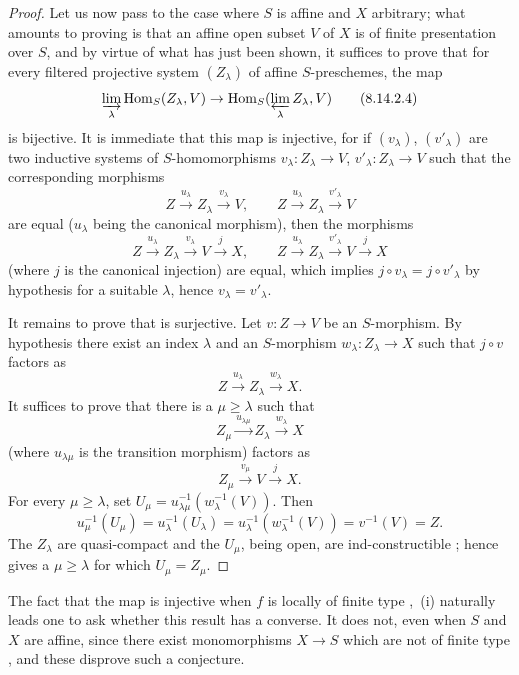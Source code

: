 \begin{proof}
Let us now pass to the case where $S$ is affine and $X$ arbitrary; what amounts to proving is that an affine open subset $V$ of $X$ is of finite presentation over $S$, and by virtue of what has just been shown, it suffices to prove that for every filtered projective system $(Z_\lambda)$ of affine $S$-preschemes, the map
\begin{equation}
\label{IV.8.14.2.4}
\varinjlim_\lambda\operatorname{Hom}_S(Z_\lambda,V)\to\operatorname{Hom}_S(\varprojlim_\lambda Z_\lambda,V) \tag{8.14.2.4}
\end{equation}
is bijective.
It is immediate that this map is injective, for if $(v_\lambda)$, $(v'_\lambda)$ are two inductive systems of $S$-homomorphisms $v_\lambda:Z_\lambda\to V$, $v'_\lambda:Z_\lambda\to V$ such that the corresponding morphisms
\[
Z\xrightarrow{u_\lambda}Z_\lambda\xrightarrow{v_\lambda}V,\qquad
Z\xrightarrow{u_\lambda}Z_\lambda\xrightarrow{v'_\lambda}V
\]
are equal ($u_\lambda$ being the canonical morphism), then the morphisms
\[
Z\xrightarrow{u_\lambda}Z_\lambda\xrightarrow{v_\lambda}V\xrightarrow{j}X,\qquad Z\xrightarrow{u_\lambda}Z_\lambda\xrightarrow{v'_\lambda}V\xrightarrow{j}X
\]
(where $j$ is the canonical injection) are equal, which implies $j\circ v_\lambda=j\circ v'_\lambda$ by hypothesis for a suitable $\lambda$, hence $v_\lambda=v'_\lambda$.


It remains to prove that  is surjective.
Let $v:Z\to V$ be an $S$-morphism.
By hypothesis there exist an index $\lambda$ and an $S$-morphism
$w_\lambda:Z_\lambda\to X$ such that $j\circ v$ factors as
\[
 Z\xrightarrow{u_\lambda}Z_\lambda\xrightarrow{w_\lambda}X.
\]
It suffices to prove that there is a $\mu\geqslant\lambda$ such that
\[
 Z_\mu\xrightarrow{u_{\lambda\mu}}Z_\lambda\xrightarrow{w_\lambda}X
\]
(where $u_{\lambda\mu}$ is the transition morphism) factors as
\[
 Z_\mu\xrightarrow{v_\mu}V\xrightarrow{j}X.
\]
For every $\mu\geqslant\lambda$, set
$U_\mu=u_{\lambda\mu}^{-1}(w_\lambda^{-1}(V))$.
Then
\[
 u_\mu^{-1}(U_\mu)=u_\lambda^{-1}(U_\lambda)
 =u_\lambda^{-1}(w_\lambda^{-1}(V))
 =v^{-1}(V)=Z.
\]
The $Z_\lambda$ are quasi-compact and the $U_\mu$, being open, are
ind-constructible ; hence  gives a
$\mu\geqslant\lambda$ for which $U_\mu=Z_\mu$.
\end{proof}

\begin{remark}[8.14.3]
\label{IV.8.14.3}
The fact that the map  is injective when $f$ is locally of finite
type ,~(i) naturally leads one to ask whether this result has a converse.
It does not, even when $S$ and $X$ are affine, since there exist monomorphisms
$X\to S$ which are not of finite type , and these disprove such a
conjecture.
\end{remark}
